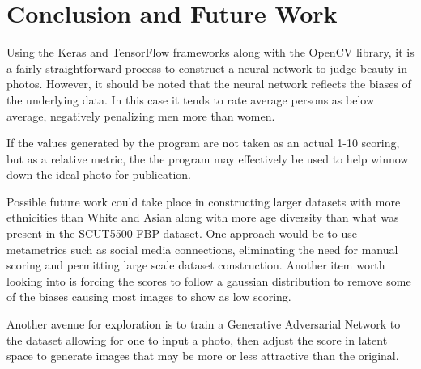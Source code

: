 \documentclass{article}
\begin{document}
\section{Conclusion and Future Work}

Using the Keras and TensorFlow frameworks along with the OpenCV library, it is a fairly straightforward process to construct a neural network to judge beauty in photos.  However, it should be noted that the neural network reflects the biases of the underlying data.  In this case it tends to rate average persons as below average, negatively penalizing men more than women.

If the values generated by the program are not taken as an actual 1-10 scoring, but as a relative metric, the the program may effectively be used to help winnow down the ideal photo for publication.

Possible future work could take place in constructing larger datasets with more ethnicities than White and Asian along with more age diversity than what was present in the SCUT5500-FBP dataset.  One approach would be to use metametrics such as social media connections, eliminating the need for manual scoring and permitting large scale dataset construction.  Another item worth looking into is forcing the scores to follow a gaussian distribution to remove some of the biases causing most images to show as low scoring.

Another avenue for exploration is to train a Generative Adversarial Network to the dataset allowing for one to input a photo, then adjust the score in latent space to generate images that may be more or less attractive than the original.

\medskip

\small



\end{document}
